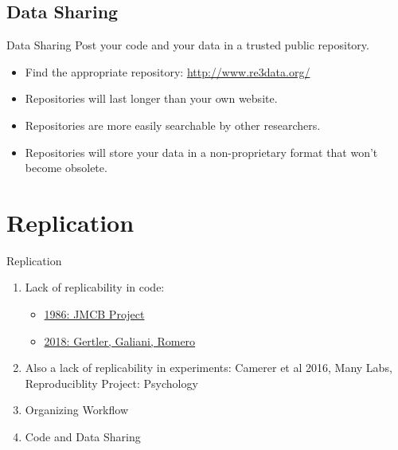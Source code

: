 \documentclass[aspectratio=169]{beamer}
\begin{document}

\subsection*{Data Sharing}
\begin{frame}{Data Sharing}
Post your code and your data in a trusted public repository.
\begin{itemize}[<.->]
\item
Find the appropriate repository: \url{http://www.re3data.org/}
\item
Repositories will last longer than your own website.
\item
Repositories are more easily searchable by other researchers.
\item
Repositories will store your data in a non-proprietary format that won't become obsolete.
\end{itemize}
\end{frame}


\section{Replication}
\begin{frame}{Replication}
\begin{enumerate}[<.->]
 \item Lack of replicability in code:
 \begin{itemize}
 \item	\href{http://www.jstor.org/stable/1806061}{1986: JMCB Project} 
 \item  \href{https://www.nature.com/articles/d41586-018-02108-9}{2018: Gertler, Galiani, Romero}
 \end{itemize}
 \item Also a lack of replicability in experiments: Camerer et al 2016, Many Labs, Reproduciblity Project: Psychology 
 \item Organizing Workflow
 \item Code and Data Sharing
\end{enumerate}
\end{frame}
\end{document}
